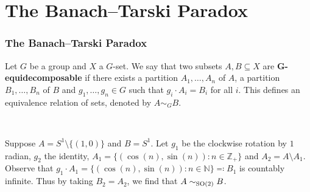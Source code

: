 \documentclass{beamer}
\newtheorem{proposition}{Proposition}
\begin{document}

\section{The Banach--Tarski Paradox}

\begin{frame}
\frametitle{The Banach--Tarski Paradox}

\begin{definition}[Equidecomposability]
Let $G$ be a group and $X$ a $G$-set. We say that two subsets $A, B \subseteq X$ are \textbf{$\boldsymbol{G}$-equidecomposable} if there exists a partition $A_1, \dots, A_n$ of $A$, a partition $B_1, \dots, B_n$ of $B$ and $g_1, \dots, g_n \in G$ such that $g_i\cdot A_i = B_i$ for all $i$. This defines an equivalence relation of sets, denoted by $A \sim_G B$.
\end{definition}
\noindent\\[0.5\baselineskip]%
\begin{example}
Suppose $A = S^1\setminus\{(1, 0)\}$ and $B = S^1$. Let $g_1$ be the clockwise rotation by $1$ radian, $g_2$ the identity, $A_1 = \{(\cos(n), \sin(n)) : n \in \mathbb{Z}_+\}$ and $A_2 = A\setminus A_1$. Observe that $g_1\cdot A_1 = \{(\cos(n), \sin(n)) : n \in \mathbb{N}\} \eqcolon B_1$ is countably infinite. Thus by taking $B_2 = A_2$, we find that $A \sim_{\textup{SO}(2)} B$.
\end{example}
\end{frame}
\end{document}
